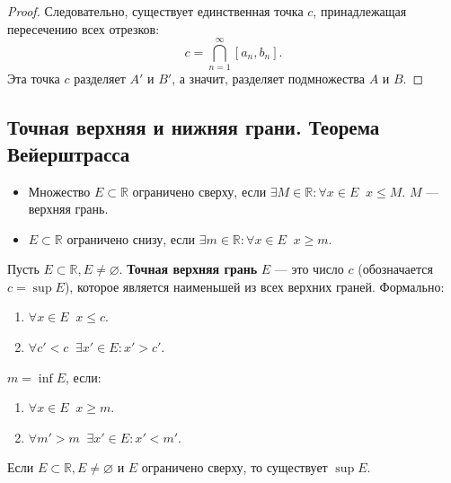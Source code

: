 \begin{proof}
    Следовательно, существует единственная точка $c$, принадлежащая пересечению всех отрезков:
    \[ c = \bigcap_{n=1}^{\infty} [a_n, b_n]. \]
    Эта точка $c$ разделяет $A'$ и $B'$, а значит, разделяет подмножества $A$ и $B$.
\end{proof}

\newpage

\subsection{Точная верхняя и нижняя грани. Теорема Вейерштрасса}

\begin{definition}
    \begin{itemize}
        \item Множество $E \subset \mathbb{R}$ ограничено сверху, если $\exists M \in \mathbb{R}: \forall x \in E \;\; x \le M$. $M$ — верхняя грань.
        \item $E \subset \mathbb{R}$ ограничено снизу, если $\exists m \in \mathbb{R}: \forall x \in E \;\; x \ge m$.
    \end{itemize}
\end{definition}

\begin{definition}[Supremum]
    Пусть $E \subset \mathbb{R}, E \neq \varnothing$. \textbf{Точная верхняя грань} $E$ — это число $c$ (обозначается $c = \sup E$), которое является наименьшей из всех верхних граней.
    Формально:
    \begin{enumerate}
        \item $\forall x \in E \;\; x \le c$.
        \item $\forall c' < c \;\; \exists x' \in E: x' > c'$.
    \end{enumerate}
\end{definition}

\begin{definition}[Infimum]
    $m = \inf E$, если:
    \begin{enumerate}
        \item $\forall x \in E \;\; x \ge m$.
        \item $\forall m' > m \;\; \exists x' \in E: x' < m'$.
    \end{enumerate}
\end{definition}

\begin{theorem}
    Если $E \subset \mathbb{R}, E \neq \varnothing$ и $E$ ограничено сверху, то существует $\sup E$.
\end{theorem}

